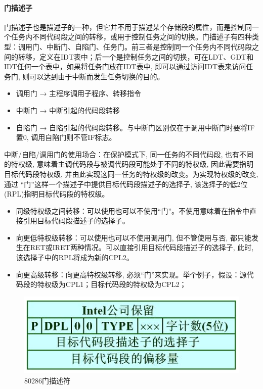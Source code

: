 \documentclass[12pt]{article}
\begin{document}
\paragraph{门描述子}
门描述子也是描述子的一种，但它并不用于描述某个存储段的属性，而是控制同一个任务内不同代码段之间的转移，或用于控制任务之间的切换。门描述子有四种类型：调用门、中断门、自陷门、任务门。前三者是控制同一个任务内不同代码段之间的转移，定义在IDT表中；后一个是控制任务之间的切换，可在LDT、GDT和IDT任何一个表中，如果将任务门放在IDT表中, 即可以通过访问IDT表来访问任务门, 则可以达到由于中断而发生任务切换的目的。
\begin{itemize}
\item 调用门 → 主程序调用子程序、转移指令
\item 中断门 → 中断引起的代码段转移
\item 自陷门 → 自陷引起的代码段转移。与中断门区别仅在于调用中断门时要将IF置0, 调用自陷门则不管IF标志。
\end{itemize}
中断/自陷/调用门的使用场合：在保护模式下, 同一任务的不同代码段, 也有不同的特权级, 意味着主调代码段与被调代码段可能处于不同的特权级, 因此需要指明目标代码段特权级, 并由此实现这同一任务的特权级的改变。为实现特权级的改变, 通过 “门”这样一个描述子中提供目标代码段描述子的选择子, 该选择子的低2位(RPL)指明目标代码段的特权级。
\begin{itemize}
\item 同级特权级之间转移：可以使用也可以不使用“门”。不使用意味着在指令中直接引用目标代码段描述子的选择子。
\item 向更低特权级转移：可以使用也可以不使用调用门, 但不管使用与否, 都只能发生在RET或IRET两种情况。可以直接引用目标代码段描述子的选择子, 此时,该选择子中的RPL将成为新的CPL2。
\item 向更高级转移：向更高特权级转移, 必须“门”来实现。举个例子，假设：源代码段的特权级为CPL1；目标代码段的特权级为CPL2；
\end{itemize}
\begin{figure}[htbp]
\centering
\includegraphics[scale=0.7]{fig/20.png}
\caption{80286门描述符}
\label{fig:80286 Gate Discriptor}
\end{figure}
\end{document}
